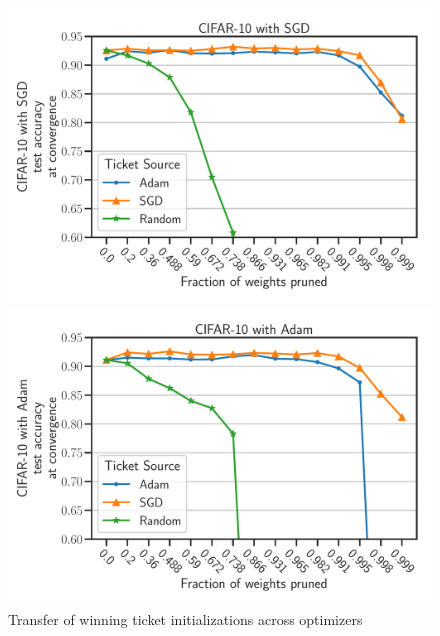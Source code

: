 \documentclass{article}
\begin{document}
\begin{figure}[h]
    \centering
    \begin{minipage}{.497\textwidth}
    \includegraphics[width=\textwidth]{plots/Exp3_CIFAR10_SGD_N.pdf}
    \end{minipage}
    \begin{minipage}{.497\textwidth}
    \includegraphics[width=\textwidth]{plots/Exp3_CIFAR10_Adam_N.pdf}
    \end{minipage}
    \caption{Transfer of winning ticket initializations across optimizers}
    \label{fig:exp3}
\end{figure}
\end{document}
